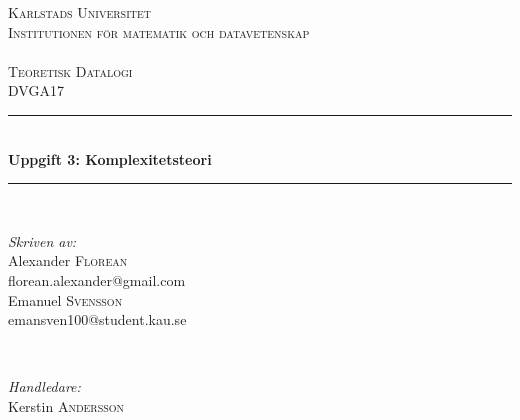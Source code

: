 \begin{titlepage}

\newcommand{\HRule}{\rule{\linewidth}{0.5mm}} %

\center %
 

 \textsc{\LARGE{Karlstads Universitet}\\ \small Institutionen för matematik och datavetenskap}\\
 \textsc{\Large \\Teoretisk Datalogi \\ \small DVGA17}\\ %



 \HRule \\[0.3cm]
 { \huge \bfseries Uppgift 3: Komplexitetsteori}\\[0.3cm] %
 \HRule \\[1.5cm]
  

  \begin{minipage}{0.4\textwidth}
  \begin{flushleft} \large
  \emph{Skriven av:}\\
  Alexander \textsc{Florean}\\
  florean.alexander@gmail.com\\ 
  Emanuel \textsc{Svensson}\\
  
  emansven100@student.kau.se
  \end{flushleft}
  \end{minipage}
  ~
  \begin{minipage}{0.4\textwidth}
  \begin{flushright} \large
  \emph{Handledare:}\\
  Kerstin \textsc{Andersson}
  

\end{flushright}
\end{minipage}
\end{titlepage}
